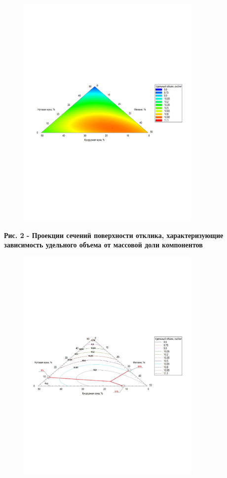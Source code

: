 \begin{figure}[H]
	\centering
	\includegraphics[width=0.8\textwidth]{media/pish/image2}
	\caption*{}
\end{figure}


{\bfseries Рис. 2 - Проекции сечений поверхности отклика, характеризующие
зависимость удельного объема от массовой доли компонентов}

\begin{figure}[H]
	\centering
	\includegraphics[width=0.8\textwidth]{media/pish/image3}
	\caption*{}
\end{figure}


